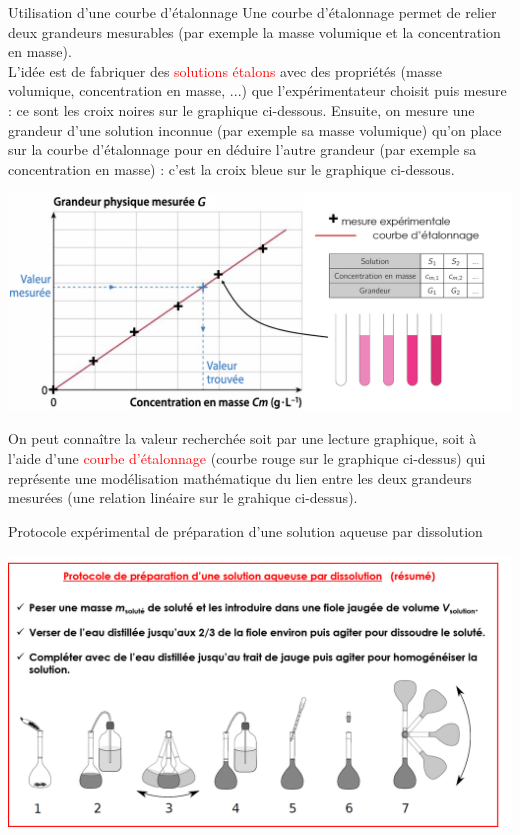 \begin{doc}{Utilisation d'une courbe d'étalonnage}
Une courbe d'étalonnage permet de relier deux grandeurs mesurables (par exemple la masse volumique et la concentration en masse). \\
L'idée est de fabriquer des \textcolor{red}{solutions étalons} avec des propriétés (masse volumique, concentration en masse, ...) que l'expérimentateur choisit puis mesure : ce sont les croix noires sur le graphique ci-dessous. Ensuite, on mesure une grandeur d'une solution inconnue (par exemple sa masse volumique) qu'on place sur la courbe d'étalonnage pour en déduire l'autre grandeur (par exemple sa concentration en masse) : c'est la croix bleue sur le graphique ci-dessous.
\begin{center}
    \includegraphics[scale=0.5]{Images/Courbe_etalonnage.png}
\end{center}
On peut connaître la valeur recherchée soit par une lecture graphique, soit à l'aide d'une \textcolor{red}{courbe d'étalonnage} (courbe rouge sur le graphique ci-dessus) qui représente une modélisation mathématique du lien entre les deux grandeurs mesurées (une relation linéaire sur le grahique ci-dessus).
\end{doc}
\begin{doc}{Protocole expérimental de préparation d'une solution aqueuse par dissolution}
\vspace{-0.8cm}
\begin{center}
    \includegraphics[scale=0.5]{Images/Dissolution.png}
  \end{center}

\end{doc}

